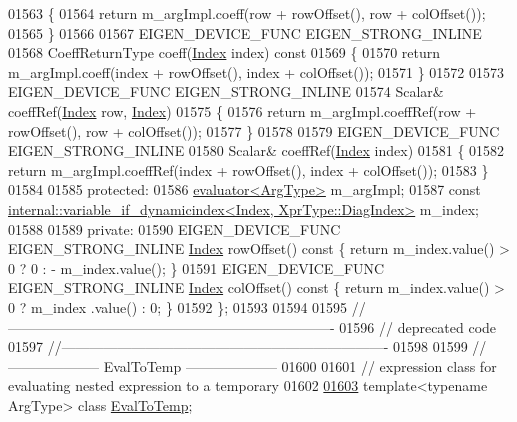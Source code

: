 \begin{DoxyCode}
01563 \textcolor{keyword}{  }\{
01564     \textcolor{keywordflow}{return} m\_argImpl.coeff(row + rowOffset(), row + colOffset());
01565   \}
01566 
01567   EIGEN\_DEVICE\_FUNC EIGEN\_STRONG\_INLINE
01568   CoeffReturnType coeff(\hyperlink{namespace_eigen_a62e77e0933482dafde8fe197d9a2cfde}{Index} index)\textcolor{keyword}{ const}
01569 \textcolor{keyword}{  }\{
01570     \textcolor{keywordflow}{return} m\_argImpl.coeff(index + rowOffset(), index + colOffset());
01571   \}
01572 
01573   EIGEN\_DEVICE\_FUNC EIGEN\_STRONG\_INLINE
01574   Scalar& coeffRef(\hyperlink{namespace_eigen_a62e77e0933482dafde8fe197d9a2cfde}{Index} row, \hyperlink{namespace_eigen_a62e77e0933482dafde8fe197d9a2cfde}{Index})
01575   \{
01576     \textcolor{keywordflow}{return} m\_argImpl.coeffRef(row + rowOffset(), row + colOffset());
01577   \}
01578 
01579   EIGEN\_DEVICE\_FUNC EIGEN\_STRONG\_INLINE
01580   Scalar& coeffRef(\hyperlink{namespace_eigen_a62e77e0933482dafde8fe197d9a2cfde}{Index} index)
01581   \{
01582     \textcolor{keywordflow}{return} m\_argImpl.coeffRef(index + rowOffset(), index + colOffset());
01583   \}
01584 
01585 \textcolor{keyword}{protected}:
01586   \hyperlink{struct_eigen_1_1internal_1_1evaluator}{evaluator<ArgType>} m\_argImpl;
01587   \textcolor{keyword}{const} \hyperlink{class_eigen_1_1internal_1_1variable__if__dynamicindex}{internal::variable\_if\_dynamicindex<Index, XprType::DiagIndex>}
       m\_index;
01588 
01589 \textcolor{keyword}{private}:
01590   EIGEN\_DEVICE\_FUNC EIGEN\_STRONG\_INLINE \hyperlink{namespace_eigen_a62e77e0933482dafde8fe197d9a2cfde}{Index} rowOffset()\textcolor{keyword}{ const }\{ \textcolor{keywordflow}{return} m\_index.value() > 0 ? 0 : -
      m\_index.value(); \}
01591   EIGEN\_DEVICE\_FUNC EIGEN\_STRONG\_INLINE \hyperlink{namespace_eigen_a62e77e0933482dafde8fe197d9a2cfde}{Index} colOffset()\textcolor{keyword}{ const }\{ \textcolor{keywordflow}{return} m\_index.value() > 0 ? m\_index
      .value() : 0; \}
01592 \};
01593 
01594 
01595 \textcolor{comment}{//----------------------------------------------------------------------}
01596 \textcolor{comment}{// deprecated code}
01597 \textcolor{comment}{//----------------------------------------------------------------------}
01598 
01599 \textcolor{comment}{// -------------------- EvalToTemp --------------------}
01600 
01601 \textcolor{comment}{// expression class for evaluating nested expression to a temporary}
01602 
\hyperlink{class_eigen_1_1internal_1_1_eval_to_temp}{01603} \textcolor{keyword}{template}<\textcolor{keyword}{typename} ArgType> \textcolor{keyword}{class }\hyperlink{class_eigen_1_1internal_1_1_eval_to_temp}{EvalToTemp};

\end{DoxyCode}
